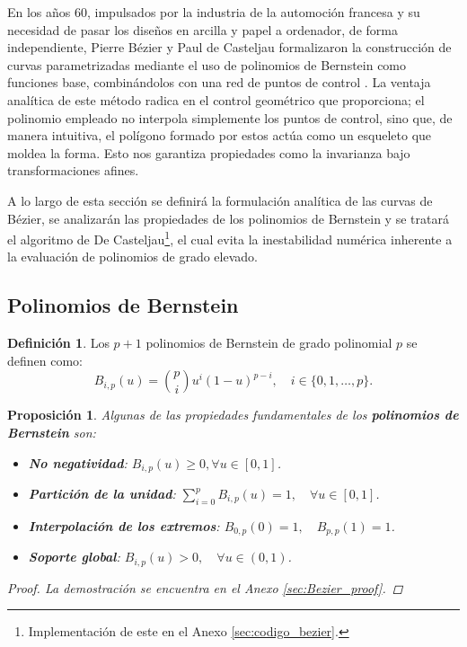 \documentclass[11pt]{book}
\theoremstyle{plain} %
\newtheorem{proposicion}[teorema]{Proposición}
\theoremstyle{definition} %
\newtheorem*{defin}{Definición} %
\theoremstyle{definition} %
\begin{document}
En los años 60, impulsados por la industria de la automoción francesa y su necesidad de pasar los diseños en arcilla y papel a ordenador,
de forma independiente, Pierre Bézier y Paul de Casteljau formalizaron la construcción de curvas parametrizadas mediante el uso de polinomios de Bernstein como funciones base, combinándolos con una red de puntos de control \cite{farin_curves_2002}.
La ventaja analítica de este método radica en el control geométrico que proporciona;
el polinomio empleado no interpola simplemente los puntos de control, sino que, de manera intuitiva,
el polígono formado por estos actúa como un esqueleto que moldea la forma.
Esto nos garantiza propiedades como la invarianza bajo transformaciones afines.

A lo largo de esta sección se definirá la formulación analítica de las curvas de Bézier, se analizarán las propiedades de los
polinomios de Bernstein y se tratará el algoritmo de De Casteljau\footnote{Implementación de este en el Anexo \ref{sec:codigo_bezier}.}, el cual evita la inestabilidad numérica
inherente a la evaluación de polinomios de grado elevado.

\vspace{-0.2cm}

\subsection{Polinomios de Bernstein}

\vspace{-0.1cm}

\begin{defin}
Los $p+1$ polinomios de Bernstein de grado polinomial $p$ se definen como: $$B_{i,p}(u) = \binom{p}{i} u^{i} (1-u)^{p-i}, \quad i \in \{0,1, \dots , p\}.$$
\end{defin}

\vspace{-0.4cm}

\begin{proposicion}
    Algunas de las propiedades fundamentales de los \textbf{polinomios de Bernstein} son:\vspace{-0.1cm}
    \begin{itemize}
        \item \textbf{No negatividad}: $B_{i,p}(u) \geq 0, \forall u \in [0,1]$.\vspace{-0.1cm}
        \item \textbf{Partición de la unidad}: $\sum_{i=0}^{p} B_{i,p}(u) = 1, \quad \forall u \in [0,1]$.\vspace{-0.1cm}
        \item \textbf{Interpolación de los extremos}: $B_{0,p}(0) = 1, \quad B_{p,p}(1) = 1$.\vspace{-0.1cm}
        \item \textbf{Soporte global}: $B_{i,p}(u) > 0, \quad \forall u \in (0,1)$.
    \end{itemize}
    \begin{proof}
        La demostración se encuentra en el Anexo \ref{sec:Bezier_proof}.
    \end{proof}
\end{proposicion}
\end{document}
